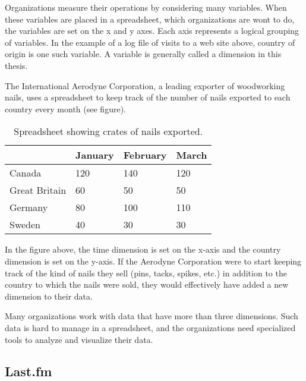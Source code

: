 Organizations measure their operations by considering many variables. When
these variables are placed in a spreadsheet, which organizations are wont to
do, the variables are set on the x and y axes. Each axis represents a logical
grouping of variables. In the example of a log file of visits to a web site
above, country of origin is one such variable. A variable is generally called
a dimension in this thesis.

The International Aerodyne Corporation, a leading exporter of woodworking
nails, uses a spreadsheet to keep track of the number of nails exported to
each country every month (see figure). 

\begin{table}[h]
    \begin{center}
        \begin{tabular}{|l|l|l|l|}
        \hline
         & January & February & March \\
        \hline
        Canada & 120 & 140 & 120 \\
        \hline
        Great Britain & 60 & 50 & 50 \\
        \hline
        Germany & 80 & 100 & 110 \\
        \hline
        Sweden & 40 & 30 & 30 \\
        \hline
        \end{tabular}
        \caption{Spreadsheet showing crates of nails exported.}
    \end{center}
\end{table}

\vspace{-12pt}

In the figure above, the time dimension is set on the x-axis and the country
dimension is set on the y-axis. If the Aerodyne Corporation were to start
keeping track of the kind of nails they sell (pins, tacks, spikes, etc.) in
addition to the country to which the nails were sold, they would effectively
have added a new dimension to their data.

Many organizations work with data that have more than three dimensions. Such
data is hard to manage in a spreadsheet, and the organizations need
specialized tools to analyze and visualize their data.


\subsection*{Last.fm}



